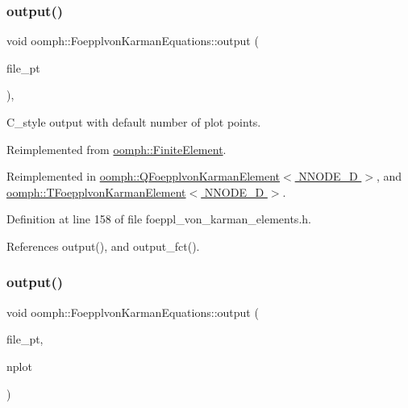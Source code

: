 \subsubsection{\texorpdfstring{output()}{output()}\hspace{0.1cm}{\footnotesize\ttfamily [3/4]}}
{\footnotesize\ttfamily void oomph\+::\+Foepplvon\+Karman\+Equations\+::output (\begin{DoxyParamCaption}\item[{F\+I\+LE $\ast$}]{file\+\_\+pt }\end{DoxyParamCaption})\hspace{0.3cm}{\ttfamily [inline]}, {\ttfamily [virtual]}}



C\+\_\+style output with default number of plot points. 



Reimplemented from \hyperlink{classoomph_1_1FiniteElement_a72cddd09f8ddbee1a20a1ff404c6943e}{oomph\+::\+Finite\+Element}.



Reimplemented in \hyperlink{classoomph_1_1QFoepplvonKarmanElement_a8ac6c9196e21b2848e1519f572a0e24e}{oomph\+::\+Q\+Foepplvon\+Karman\+Element$<$ N\+N\+O\+D\+E\+\_\+D $>$}, and \hyperlink{classoomph_1_1TFoepplvonKarmanElement_ad6676ce8249127f37757d46b94cd1407}{oomph\+::\+T\+Foepplvon\+Karman\+Element$<$ N\+N\+O\+D\+E\+\_\+D $>$}.



Definition at line 158 of file foeppl\+\_\+von\+\_\+karman\+\_\+elements.\+h.



References output(), and output\+\_\+fct().

\mbox{\label{classoomph_1_1FoepplvonKarmanEquations_a9972ef429bbcf53c733c6798dd68271a}} 
\subsubsection{\texorpdfstring{output()}{output()}\hspace{0.1cm}{\footnotesize\ttfamily [4/4]}}
{\footnotesize\ttfamily void oomph\+::\+Foepplvon\+Karman\+Equations\+::output (\begin{DoxyParamCaption}\item[{F\+I\+LE $\ast$}]{file\+\_\+pt,  }\item[{const unsigned \&}]{nplot }\end{DoxyParamCaption})\hspace{0.3cm}{\ttfamily [virtual]}}



